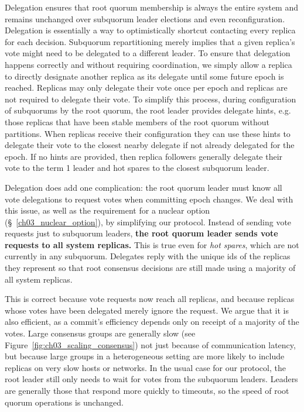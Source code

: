 Delegation ensures that root quorum membership is always the entire system and remains unchanged over subquorum leader elections and even reconfiguration.
Delegation is essentially a way to optimistically shortcut contacting every replica for each decision.
Subquorum repartitioning merely implies that a given replica's vote might need to be delegated to a different leader.
To ensure that delegation happens correctly and without requiring coordination, we simply allow a replica to directly designate another replica as its delegate until some future epoch is reached.
Replicas may only delegate their vote once per epoch and replicas are not required to delegate their vote.
To simplify this process, during configuration of subquorums by the root quorum, the root leader provides delegate hints, e.g. those replicas that have been stable members of the root quorum without partitions.
When replicas receive their configuration they can use these hints to delegate their vote to the closest nearby delegate if not already delegated for the epoch.
If no hints are provided, then replica followers generally delegate their vote to the term 1 leader and hot spares to the closest subquorum leader.

Delegation does add one complication: the root quorum leader must know all vote delegations to request votes when committing epoch changes.
We deal with this issue, as well as the requirement for a nuclear option (\S~\ref{ch03_nuclear_option}), by simplifying our protocol.
Instead of sending vote requests just to subquorum leaders, \textbf{the root quorum leader sends vote requests to all system replicas.}
This is true even for \emph{hot spares}, which are not currently in any subquorum.
Delegates reply with the unique ids of the replicas they represent so that root consensus decisions are still made using a majority of all system replicas.

This is correct because vote requests now reach all replicas, and because replicas whose votes have been delegated merely ignore the request.
We argue that it is also efficient, as a commit's efficiency depends only on receipt of a majority of the votes.
Large consensus groups are generally slow (see Figure~\ref{fig:ch03_scaling_consensus}) not just because of communication latency, but because large groups in a heterogeneous setting are more likely to include replicas on very slow hosts or networks.
In the usual case for our protocol, the root leader still only needs to wait for votes from the subquorum leaders.
Leaders are generally those that respond more quickly to timeouts, so the
speed of root quorum operations is unchanged.

